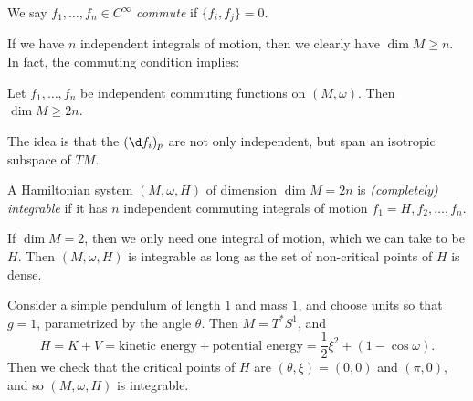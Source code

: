 \documentclass[a4paper]{article}
\begin{document}
\begin{defi}
  We say $f_1, \ldots, f_n \in C^\infty$ \emph{commute} if $\{f_i, f_j\} = 0$.
\end{defi}

If we have $n$ independent integrals of motion, then we clearly have $\dim M \geq n$. In fact, the commuting condition implies:
\begin{ex}
  Let $f_1, \ldots, f_n$ be independent commuting functions on $(M, \omega)$. Then $\dim M \geq 2n$.
\end{ex}
The idea is that the $(\d f_i)_p$ are not only independent, but span an isotropic subspace of $TM$.

\begin{defi}
  A Hamiltonian system $(M, \omega, H)$ of dimension $\dim M = 2n$ is \emph{(completely) integrable} if it has $n$ independent commuting integrals of motion $f_1 = H, f_2, \ldots, f_n$. 
\end{defi}

\begin{eg}
  If $\dim M = 2$, then we only need one integral of motion, which we can take to be $H$. Then $(M, \omega, H)$ is integrable as long as the set of non-critical points of $H$ is dense.
\end{eg}

\begin{eg}
  Consider a simple pendulum of length $1$ and mass $1$, and choose units so that $g = 1$, parametrized by the angle $\theta$. Then $M = T^* S^1$, and
  \[
    H = K + V = \text{kinetic energy} + \text{potential energy} = \frac{1}{2}\xi^2 + (1 - \cos \omega).
  \]
  Then we check that the critical points of $H$ are $(\theta, \xi) = (0, 0)$ and $(\pi, 0)$, and so $(M, \omega, H)$ is integrable.
\end{eg}
\end{document}
